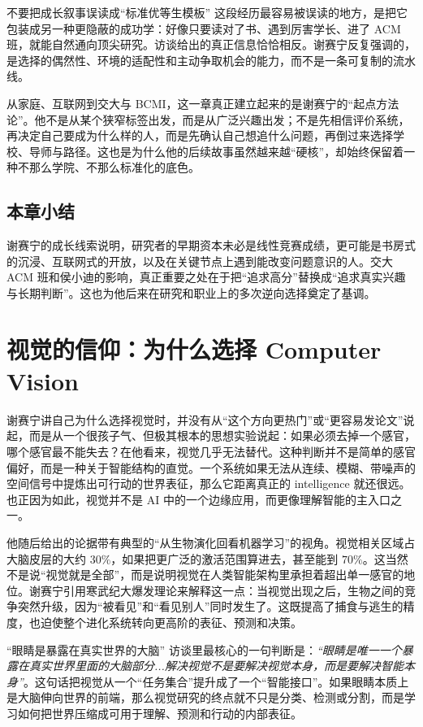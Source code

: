 \documentclass[a4paper,12pt]{article}
\begin{document}
\begin{warningbox}{不要把成长叙事误读成“标准优等生模板”}
这段经历最容易被误读的地方，是把它包装成另一种更隐蔽的成功学：好像只要读对了书、遇到厉害学长、进了 ACM 班，就能自然通向顶尖研究。访谈给出的真正信息恰恰相反。谢赛宁反复强调的，是选择的偶然性、环境的适配性和主动争取机会的能力，而不是一条可复制的流水线。
\end{warningbox}

从家庭、互联网到交大与 BCMI，这一章真正建立起来的是谢赛宁的“起点方法论”。他不是从某个狭窄标签出发，而是从广泛兴趣出发；不是先相信评价系统，再决定自己要成为什么样的人，而是先确认自己想追什么问题，再倒过来选择学校、导师与路径。这也是为什么他的后续故事虽然越来越“硬核”，却始终保留着一种不那么学院、不那么标准化的底色。

\subsection{本章小结}

谢赛宁的成长线索说明，研究者的早期资本未必是线性竞赛成绩，更可能是书房式的沉浸、互联网式的开放，以及在关键节点上遇到能改变问题意识的人。交大 ACM 班和侯小迪的影响，真正重要之处在于把“追求高分”替换成“追求真实兴趣与长期判断”。这也为他后来在研究和职业上的多次逆向选择奠定了基调。

\section{视觉的信仰：为什么选择 Computer Vision}

谢赛宁讲自己为什么选择视觉时，并没有从“这个方向更热门”或“更容易发论文”说起，而是从一个很孩子气、但极其根本的思想实验说起：如果必须去掉一个感官，哪个感官最不能失去？在他看来，视觉几乎无法替代。这种判断并不是简单的感官偏好，而是一种关于智能结构的直觉。一个系统如果无法从连续、模糊、带噪声的空间信号中提炼出可行动的世界表征，那么它距离真正的 intelligence 就还很远。也正因为如此，视觉并不是 AI 中的一个边缘应用，而更像理解智能的主入口之一。

他随后给出的论据带有典型的“从生物演化回看机器学习”的视角。视觉相关区域占大脑皮层的大约 \(30\%\)，如果把更广泛的激活范围算进去，甚至能到 \(70\%\)。这当然不是说“视觉就是全部”，而是说明视觉在人类智能架构里承担着超出单一感官的地位。谢赛宁引用寒武纪大爆发理论来解释这一点：当视觉出现之后，生物之间的竞争突然升级，因为“被看见”和“看见别人”同时发生了。这既提高了捕食与逃生的精度，也迫使整个进化系统转向更高阶的表征、预测和决策。

\begin{importantbox}{“眼睛是暴露在真实世界的大脑”}
访谈里最核心的一句判断是：\textit{``眼睛是唯一一个暴露在真实世界里面的大脑部分...解决视觉不是要解决视觉本身，而是要解决智能本身''}。这句话把视觉从一个“任务集合”提升成了一个“智能接口”。如果眼睛本质上是大脑伸向世界的前端，那么视觉研究的终点就不只是分类、检测或分割，而是学习如何把世界压缩成可用于理解、预测和行动的内部表征。
\end{importantbox}
\end{document}
